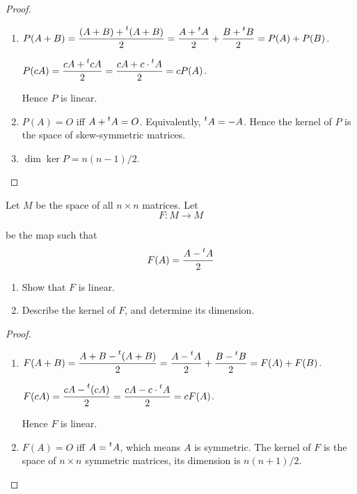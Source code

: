 \begin{proof}
    \begin{enumerate}[label={(\alph*)}]
        \item $P(A + B) = \dfrac{(A + B) + \prescript{t}{}{(A + B)}}{2} = \dfrac{A + \prescript{t}{}{A}}{2} + \dfrac{B + \prescript{t}{}{B}}{2} = P(A) + P(B)$.

              $P(cA) = \dfrac{cA + \prescript{t}{}{cA}}{2} = \dfrac{cA + c\cdot\prescript{t}{}{A}}{2} = cP(A)$.

              Hence $P$ is linear.
        \item $P(A) = O$ iff $A + \prescript{t}{}{A} = O$. Equivalently, $\prescript{t}{}{A} = -A$. Hence the kernel of $P$ is the space of skew-symmetric matrices.
        \item $\dim\ker P = n(n-1)/2$.
    \end{enumerate}
\end{proof}

\begin{exercise}
    Let $M$ be the space of all $n\times n$ matrices. Let
    \[
        F: M\to M
    \]

    be the map such that
    \[
        F(A) = \frac{A - \prescript{t}{}{A}}{2}
    \]

    \begin{enumerate}[label={(\alph*)}]
        \item Show that $F$ is linear.
        \item Describe the kernel of $F$, and determine its dimension.
    \end{enumerate}
\end{exercise}

\begin{proof}
    \begin{enumerate}[label={(\alph*)}]
        \item $F(A + B) = \dfrac{A + B - \prescript{t}{}(A + B)}{2} = \dfrac{A - \prescript{t}{}{A}}{2} + \dfrac{B - \prescript{t}{}{B}}{2} = F(A) + F(B)$.

              $F(cA) = \dfrac{cA - \prescript{t}{}(cA)}{2} = \dfrac{cA - c\cdot\prescript{t}{}{A}}{2} = cF(A)$.

              Hence $F$ is linear.
        \item $F(A) = O$ iff $A = \prescript{t}{}{A}$, which means $A$ is symmetric. The kernel of $F$ is the space of $n\times n$ symmetric matrices, its dimension is $n(n+1)/2$.
    \end{enumerate}
\end{proof}

